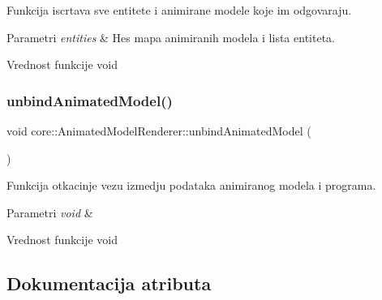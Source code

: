 Funkcija iscrtava sve entitete i animirane modele koje im odgovaraju. 


\begin{DoxyParams}{Parametri}
{\em entities} & Hes mapa animiranih modela i lista entiteta. \\
\hline
\end{DoxyParams}
\begin{DoxyReturn}{Vrednost funkcije}
void 
\end{DoxyReturn}
\mbox{\label{classcore_1_1AnimatedModelRenderer_a55f3ffa2f9ec2fc7b2f47691316cf87c}} 
\subsubsection{\texorpdfstring{unbind\+Animated\+Model()}{unbindAnimatedModel()}}
{\footnotesize\ttfamily void core\+::\+Animated\+Model\+Renderer\+::unbind\+Animated\+Model (\begin{DoxyParamCaption}{ }\end{DoxyParamCaption})}



Funkcija otkacinje vezu izmedju podataka animiranog modela i programa. 


\begin{DoxyParams}{Parametri}
{\em void} & \\
\hline
\end{DoxyParams}
\begin{DoxyReturn}{Vrednost funkcije}
void 
\end{DoxyReturn}


\subsection{Dokumentacija atributa}
\mbox{\label{classcore_1_1AnimatedModelRenderer_a2266704b843367472fcb7cb56d17f3cf}} 
